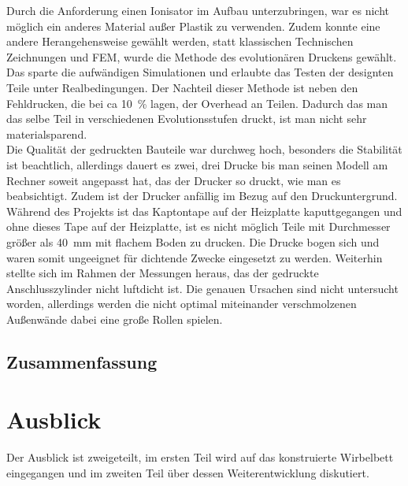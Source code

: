 Durch die Anforderung einen Ionisator im Aufbau unterzubringen, war es nicht möglich ein anderes Material außer Plastik zu verwenden. Zudem konnte eine andere Herangehensweise gewählt werden, statt klassischen Technischen Zeichnungen und FEM, wurde die Methode des evolutionären Druckens gewählt. Das sparte die aufwändigen Simulationen und erlaubte das Testen der designten Teile unter Realbedingungen. Der Nachteil dieser Methode ist neben den  Fehldrucken, die bei ca \SI{10}{\%} lagen, der Overhead an Teilen. Dadurch das man das selbe Teil in verschiedenen Evolutionsstufen druckt, ist man nicht sehr materialsparend. \\
Die Qualität der gedruckten Bauteile war durchweg hoch, besonders die Stabilität ist beachtlich, allerdings dauert es zwei, drei Drucke bis man seinen Modell am Rechner soweit angepasst hat, das der Drucker so druckt, wie man es beabsichtigt. Zudem ist der Drucker anfällig im Bezug auf den Druckuntergrund. Während des Projekts ist das Kaptontape auf der Heizplatte kaputtgegangen und ohne dieses Tape auf der Heizplatte, ist es nicht möglich Teile mit Durchmesser größer als \SI{40}{mm} mit flachem Boden zu drucken. Die Drucke bogen sich und waren somit ungeeignet für dichtende Zwecke eingesetzt zu werden. Weiterhin stellte sich im Rahmen der Messungen heraus, das der gedruckte Anschlusszylinder nicht luftdicht ist. Die genauen Ursachen sind nicht untersucht worden, allerdings werden die nicht optimal miteinander verschmolzenen Außenwände dabei eine große Rollen spielen.


\subsection{Zusammenfassung}








\section{Ausblick}

Der Ausblick ist zweigeteilt, im ersten Teil wird auf das konstruierte Wirbelbett eingegangen und im zweiten Teil über dessen Weiterentwicklung diskutiert. 

